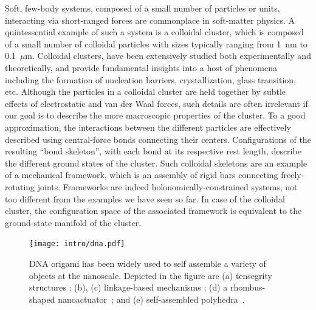 Soft, few-body systems, composed of a small number of particles or units, interacting via short-ranged forces are commonplace in soft-matter physics.
A quintessential example of such a system is a colloidal cluster, which is composed of a small number of colloidal particles with sizes typically ranging from 1~nm to 0.1~$\mu$m.
Colloidal clusters, have been extensively studied both experimentally and theoretically, and provide fundamental insights into a host of phenomena including the formation of nucleation barriers, crystallization, glass transition, etc.
Although the particles in a colloidal cluster are held together by subtle effects of electrostatic and van der Waal forces, such details are often irrelevant if our goal is to describe the more macroscopic properties of the cluster.
To a good approximation, the interactions between the different particles are effectively described using central-force bonds connecting their centers.
Configurations of the resulting ``bond skeleton'', with each bond at its respective rest length, describe the different ground states of the cluster.
Such colloidal skeletons are an example of a mechanical framework, which is an assembly of rigid bars connecting freely-rotating joints.
Frameworks are indeed holonomically-constrained systems, not too different from the examples we have seen so far.
In case of the colloidal cluster, the configuration space of the associated framework is equivalent to the ground-state manifold of the cluster.
%
\begin{figure}
  \begin{center}
    \texttt{[image: intro/dna.pdf]}
  \end{center}
  \caption{DNA origami has been widely used to self assemble a variety of objects at the nanoscale.
Depicted in the figure are (a) tensegrity structures \cite{liedl2010}; (b), (c) linkage-based mechanisms \cite{marras2015,zhou2015}; (d) a rhombus-shaped nanoactuator~\cite{ke2016}; and (e) self-assembled polyhedra~\cite{iinuma2014}.}
  \label{fig:dna_origami}
\end{figure}



